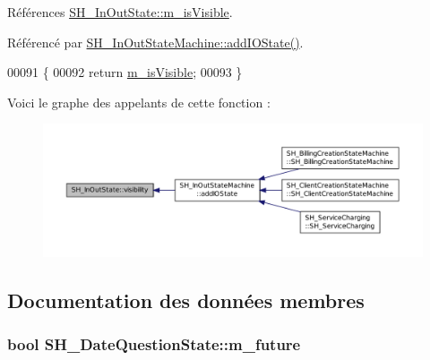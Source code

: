 Références \hyperlink{classSH__InOutState_a8fd66b185c9a55f0e84daa97e2acf53a}{S\-H\-\_\-\-In\-Out\-State\-::m\-\_\-is\-Visible}.



Référencé par \hyperlink{classSH__InOutStateMachine_ad6b778d052f741daee720c047059ce0e}{S\-H\-\_\-\-In\-Out\-State\-Machine\-::add\-I\-O\-State()}.


\begin{DoxyCode}
00091                                \{
00092     \textcolor{keywordflow}{return} \hyperlink{classSH__InOutState_a8fd66b185c9a55f0e84daa97e2acf53a}{m\_isVisible};
00093 \}
\end{DoxyCode}


Voici le graphe des appelants de cette fonction \-:
\nopagebreak
\begin{figure}[H]
\begin{center}
\leavevmode
\includegraphics[width=350pt]{classSH__InOutState_a8c496b2fe21a51a587c6e4409c0f37ec_icgraph}
\end{center}
\end{figure}




\subsection{Documentation des données membres}
\hypertarget{classSH__DateQuestionState_a0a1577dc70f9c1120a6d623f8eb635c8}{
\subsubsection[{m\-\_\-future}]{\setlength{\rightskip}{0pt plus 5cm}bool S\-H\-\_\-\-Date\-Question\-State\-::m\-\_\-future\hspace{0.3cm}{\ttfamily [private]}}}\label{classSH__DateQuestionState_a0a1577dc70f9c1120a6d623f8eb635c8}


